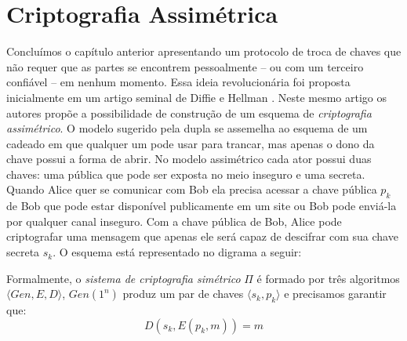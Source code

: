 \chapter{Criptografia Assimétrica}
\label{cha:criptografia-assimetrica}

Concluímos o capítulo anterior apresentando um protocolo de troca de chaves que não requer que as partes se encontrem pessoalmente -- ou com um terceiro confiável -- em nenhum momento.
Essa ideia revolucionária foi proposta inicialmente em um artigo seminal de Diffie e Hellman \cite{Diffie76}.
Neste mesmo artigo os autores propõe a possibilidade de construção de um esquema de {\em criptografia assimétrico}.
O modelo sugerido pela dupla se assemelha ao esquema de um cadeado em que qualquer um pode usar para trancar, mas apenas o dono da chave possui a forma de abrir.
No modelo assimétrico cada ator possui duas chaves: uma pública que pode ser exposta no meio inseguro e uma secreta.
Quando Alice quer se comunicar com Bob ela precisa acessar a chave pública $p_k$ de Bob que pode estar disponível publicamente em um site ou Bob pode enviá-la por qualquer canal inseguro.
Com a chave pública de Bob, Alice pode criptografar uma mensagem que apenas ele será capaz de descifrar com sua chave secreta $s_k$.
O esquema está representado no digrama a seguir:

\begin{center}
\end{center}

Formalmente, o {\em sistema de criptografia simétrico} $\Pi$ é formado por três algoritmos $\langle Gen, E, D \rangle$, $Gen(1^n)$ produz um par de chaves $\langle s_k, p_k \rangle$ e precisamos garantir que:
\begin{displaymath}
  D(s_k, E(p_k, m)) = m
\end{displaymath}

